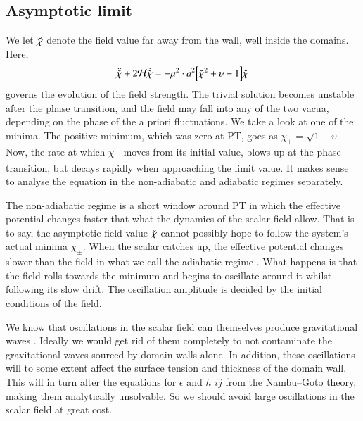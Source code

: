 \subsection{Asymptotic limit}\label{sec:PT:symm_dws:asymptotic}
    We let $\breve{\chi}$ denote the field value far away from the wall, well inside the domains. Here,
    \begin{equation}\label{eq:PT:symm_dws:eom_asym_chi_s}
        \ddot{\breve{\chi}} +  2\mathcal{H} \dot{\breve{\chi}} = - \mu^2 \cdot a^2{\left[  \breve{\chi}^2 + \upsilon - 1  \right]}\breve{\chi}
    \end{equation}
    governs the evolution of the field strength. The trivial solution becomes unstable after the phase transition, and the field may fall into any of the two vacua, depending on the phase of the a priori fluctuations. We take a look at one of the minima. The positive minimum, which was zero at PT, goes as $\chi_+ = \sqrt{1-\upsilon}$. Now, the rate at which $\chi_+$ moves from its initial value, blows up at the phase transition, but decays rapidly when approaching the limit value. %
    It makes sense to analyse the equation in the  non-adiabatic and  adiabatic regimes separately.

    The non-adiabatic regime  is a short window around PT in which the effective potential changes faster that what the dynamics of the scalar field allow. That is to say, the asymptotic field value $\breve{\chi}$ cannot possibly hope to follow the system's actual minima $\chi_\pm$. When the scalar catches up, the effective potential changes slower than the field in what we call the  adiabatic regime . What happens is that the field rolls towards the minimum and begins to oscillate around it whilst following its slow drift. The oscillation amplitude is decided by the initial conditions of the field.



    We know that oscillations in the scalar field can themselves produce gravitational waves  \citep{kawasakiStudyGravitationalRadiation2011}. Ideally we would get rid of them completely to not contaminate the gravitational waves sourced by domain walls alone. %
    In addition, these oscillations will to some extent affect the surface tension and thickness of the domain wall. This will in turn alter the equations for $\epsilon$ and $h\_{ij}$ from the Nambu--Goto theory, making them analytically unsolvable. So we should avoid large oscillations in the scalar field at great cost.
    
